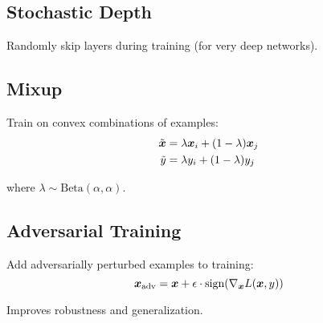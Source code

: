 \subsection{Stochastic Depth}

Randomly skip layers during training (for very deep networks).

\subsection{Mixup}

Train on convex combinations of examples:
\begin{align}
\tilde{\boldsymbol{x}} &= \lambda \boldsymbol{x}_i + (1-\lambda) \boldsymbol{x}_j \\
\tilde{y} &= \lambda y_i + (1-\lambda) y_j
\end{align}

where $\lambda \sim \text{Beta}(\alpha, \alpha)$.

\subsection{Adversarial Training}

Add adversarially perturbed examples to training:
\begin{equation}
\boldsymbol{x}_{\text{adv}} = \boldsymbol{x} + \epsilon \cdot \text{sign}(\nabla_{\boldsymbol{x}} L(\boldsymbol{x}, y))
\end{equation}

Improves robustness and generalization.
